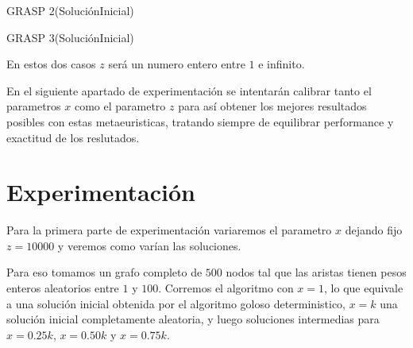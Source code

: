 \begin{algorithm}
  	\begin{algorithmic}[1]\parskip=1mm
		 \caption{ GRASP 2(SoluciónInicial) }
	\end{algorithmic}
\end{algorithm}

\begin{algorithm}
  	\begin{algorithmic}[1]\parskip=1mm
		 \caption{ GRASP 3(SoluciónInicial) }
	\end{algorithmic}
\end{algorithm}

En estos dos casos $z$ será un numero entero entre $1$ e infinito.

En el siguiente apartado de experimentación se intentarán calibrar tanto el parametros $x$ como el parametro $z$ para así obtener los mejores resultados posibles con estas metaeuristicas, tratando siempre de equilibrar performance y exactitud de los reslutados.

\section{Experimentación}

Para la primera parte de experimentación variaremos el parametro $x$ dejando fijo $z = 10000$ y veremos como varían las soluciones.

Para eso tomamos un grafo completo de $500$ nodos tal que las aristas tienen pesos enteros aleatorios entre $1$ y $100$. Corremos el algoritmo con $x=1$, lo que equivale a una solución inicial obtenida por el algoritmo goloso deterministico, $x=k$ una solución inicial completamente aleatoria, y luego soluciones intermedias para $x = 0.25 k$, $x = 0.50k$ y $x = 0.75 k$.

